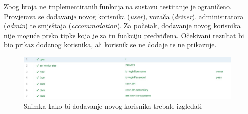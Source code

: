 			 
			
			Zbog broja ne implementiranih funkcija na sustavu testiranje je ograničeno. \newline
			Provjerava se dodavanje novog korisnika (\textit{user}), vozača (\textit{driver}), administratora (\textit{admin}) te smještaja (\textit{accommodation}).
			Za početak, dodavanje novog korisnika nije moguće preko tipke koja je za tu funkciju predviđena. Očekivani rezultat bi bio prikaz dodanog korisnika, ali korisnik se ne dodaje te ne prikazuje.
			
			\begin{figure}[H]
				\includegraphics[width=\textwidth]{slike/addingANewUserTest.JPG}
				\caption{Snimka kako bi dodavanje novog korisnika trebalo izgledati}
				\label{addingANewUserTest}
			\end{figure}
			
